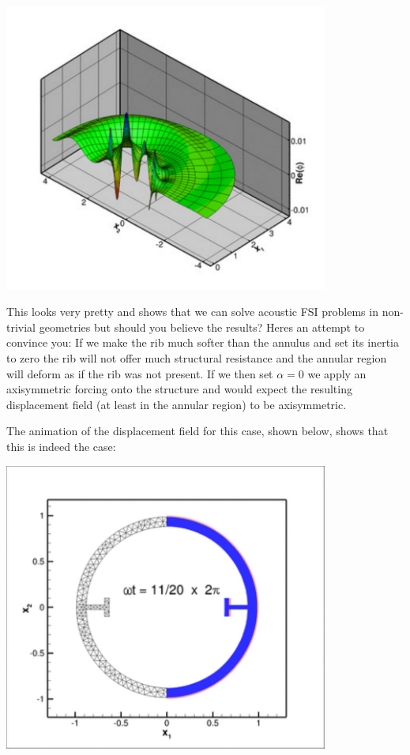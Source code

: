  
\begin{DoxyImage}
\includegraphics[width=0.8\textwidth]{potential_unstr}
\end{DoxyImage}


This looks very pretty and shows that we can solve acoustic F\+SI problems in non-\/trivial geometries but should you believe the results? Here\textquotesingle{}s an attempt to convince you\+: If we make the rib much softer than the annulus and set its inertia to zero the rib will not offer much structural resistance and the annular region will deform as if the rib was not present. If we then set $ \alpha = 0 $ we apply an axisymmetric forcing onto the structure and would expect the resulting displacement field (at least in the annular region) to be axisymmetric.

The animation of the displacement field for this case, shown below, shows that this is indeed the case\+:

 
\begin{DoxyImage}
\includegraphics[width=0.8\textwidth]{anim_alpha0}
\end{DoxyImage}


